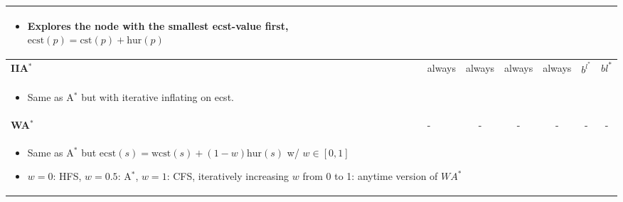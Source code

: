\begin{summary}
\begin{center}
\begin{tabular}{llccccc}
{        \begin{itemize}
            \item Explores the node with the smallest ecst-value first, $\text{ecst}(p) = \text{cst}(p) + \text{hur}(p)$
        \end{itemize}} \\
        \midrule
        \textbf{IIA$^*$} & always & always & always & always & $b^{l^{*}}$ & $bl^{*} $ \\
        \multicolumn{7}{p{\linewidth}}{
        \begin{itemize}
            \item Same as A$^*$ but with iterative inflating on ecst.
        \end{itemize}} \\
        \midrule
        \textbf{WA$^*$} & - & - & - & - & - & - \\
        \multicolumn{7}{p{\linewidth}}{
            \begin{itemize}
                \item Same as A$^*$ but $\text{ecst}(s) = \text{wcst}(s) + (1-w)\text{hur}(s)$ w/ $w \in [0,1]$
                \item $w=0$: HFS, $w=0.5$: A$^*$, $w=1$: CFS, iteratively increasing $w$ from 0 to 1: anytime version of $WA^*$
            \end{itemize}} \\
        \bottomrule
        \end{tabular}
    \end{center}
\end{summary}
\newpage

